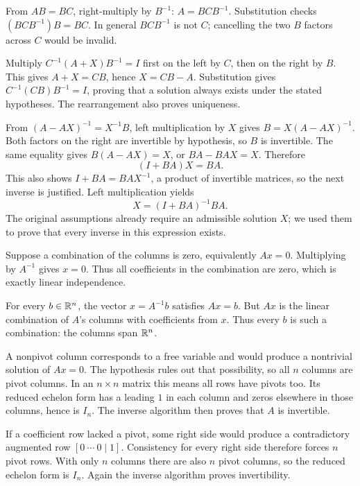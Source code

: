 From $AB=BC$, right-multiply by $B^{-1}$:
$\boxed{A=BCB^{-1}}$. Substitution checks
$(BCB^{-1})B=BC$. In general $BCB^{-1}$ is not $C$; cancelling the two
$B$ factors across $C$ would be invalid.

Multiply $C^{-1}(A+X)B^{-1}=I$ first on the left by $C$, then on the
right by $B$. This gives $A+X=CB$, hence
$\boxed{X=CB-A}$. Substitution gives
$C^{-1}(CB)B^{-1}=I$, proving that a solution always exists under the
stated hypotheses. The rearrangement also proves uniqueness.

From $(A-AX)^{-1}=X^{-1}B$, left multiplication by $X$ gives
$B=X(A-AX)^{-1}$. Both factors on the right are invertible by hypothesis,
so $B$ is invertible.
The same equality gives $B(A-AX)=X$, or
$BA-BAX=X$. Therefore
\[
 (I+BA)X=BA.
\]
This also shows $I+BA=BAX^{-1}$, a product of invertible matrices,
so the next inverse is justified. Left multiplication yields
\[
 \boxed{X=(I+BA)^{-1}BA}.
\]
The original assumptions already require an admissible solution $X$;
we used them to prove that every inverse in this expression exists.

Suppose a combination of the columns is zero, equivalently $Ax=0$.
Multiplying by $A^{-1}$ gives $x=0$. Thus all coefficients in the
combination are zero, which is exactly linear independence.

For every $b\in\mathbb{R}^n$, the vector $x=A^{-1}b$ satisfies $Ax=b$.
But $Ax$ is the linear combination of $A$'s columns with coefficients
from $x$. Thus every $b$ is such a combination: the columns span $\mathbb{R}^n$.

A nonpivot column corresponds to a free variable and would produce a
nontrivial solution of $Ax=0$. The hypothesis rules out that possibility,
so all $n$ columns are pivot columns. In an $n\times n$ matrix this means
all rows have pivots too. Its reduced echelon form has a leading $1$ in
each column and zeros elsewhere in those columns, hence is $I_n$.
The inverse algorithm then proves that $A$ is invertible.

If a coefficient row lacked a pivot, some right side would produce a
contradictory augmented row $[0\ \cdots\ 0\mid1]$. Consistency for every
right side therefore forces $n$ pivot rows. With only $n$ columns there
are also $n$ pivot columns, so the reduced echelon form is $I_n$.
Again the inverse algorithm proves invertibility.

